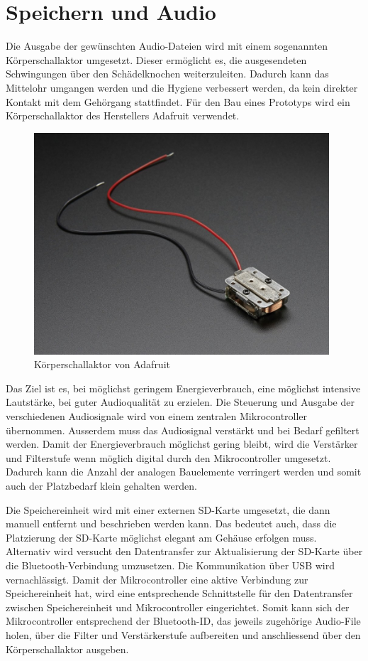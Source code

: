 \section{Speichern und Audio}

Die Ausgabe der gewünschten Audio-Dateien wird mit einem sogenannten Körperschallaktor umgesetzt. Dieser ermöglicht es, die ausgesendeten Schwingungen über den Schädelknochen weiterzuleiten. Dadurch kann das Mittelohr umgangen werden und die Hygiene verbessert werden, da kein direkter Kontakt mit dem Gehörgang stattfindet. Für den Bau eines Prototyps wird ein Körperschallaktor des Herstellers Adafruit verwendet. 

\begin{figure}[H]
\begin{center}
	\includegraphics[width=110mm]{data/Schallaktor.png}
	\caption{Körperschallaktor von Adafruit}
	\label{fig:schallaktorAdafruit}
\end{center}
\end{figure}

Das Ziel ist es, bei möglichst geringem Energieverbrauch, eine möglichst intensive Lautstärke, bei guter Audioqualität zu erzielen.
Die Steuerung und Ausgabe der verschiedenen Audiosignale wird von einem zentralen Mikrocontroller übernommen. Ausserdem muss das Audiosignal verstärkt und bei Bedarf gefiltert werden. Damit der Energieverbrauch möglichst gering bleibt, wird die Verstärker und Filterstufe wenn möglich digital durch den Mikrocontroller umgesetzt. Dadurch kann die Anzahl der analogen Bauelemente verringert werden und somit auch der Platzbedarf klein gehalten werden.

Die Speichereinheit wird mit einer externen SD-Karte umgesetzt, die dann manuell entfernt und beschrieben werden kann. Das bedeutet auch, dass die Platzierung der SD-Karte möglichst elegant am Gehäuse erfolgen muss. Alternativ wird versucht den Datentransfer zur Aktualisierung der SD-Karte über die Bluetooth-Verbindung umzusetzen. Die Kommunikation über USB wird vernachlässigt. Damit der Mikrocontroller eine aktive Verbindung zur Speichereinheit hat, wird eine entsprechende Schnittstelle für den Datentransfer zwischen Speichereinheit und Mikrocontroller eingerichtet. Somit kann sich der Mikrocontroller entsprechend der Bluetooth-ID, das jeweils zugehörige Audio-File holen, über die Filter und Verstärkerstufe aufbereiten und anschliessend über den Körperschallaktor ausgeben.
